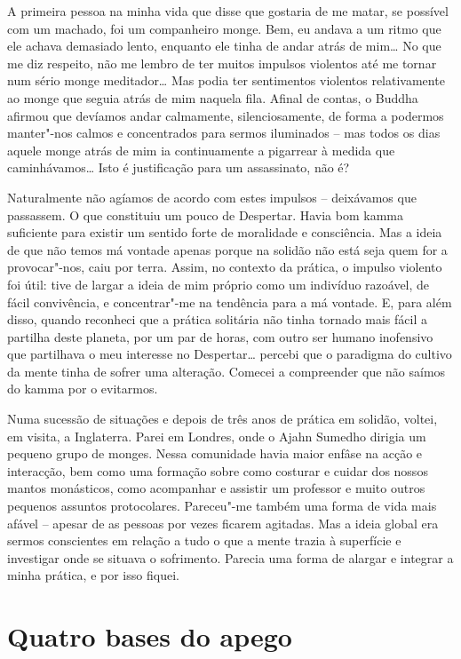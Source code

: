 A primeira pessoa na minha vida que disse que gostaria de me matar, se possível com um machado, foi um companheiro monge. Bem, eu andava a um ritmo que ele achava demasiado lento, enquanto ele tinha de andar atrás de mim\ldots{} No que me diz respeito, não me lembro de ter muitos impulsos violentos até me tornar num sério monge meditador\ldots{} Mas podia ter sentimentos violentos relativamente ao monge que seguia atrás de mim naquela fila. Afinal de contas, o Buddha afirmou que devíamos andar calmamente, silenciosamente, de forma a podermos manter"-nos calmos e concentrados para sermos iluminados -- mas todos os dias aquele monge atrás de mim ia continuamente a pigarrear à medida que caminhávamos\ldots{} Isto é justificação para um assassinato, não é?

Naturalmente não agíamos de acordo com estes impulsos -- deixávamos que passassem. O que constituiu um pouco de Despertar. Havia bom kamma suficiente para existir um sentido forte de moralidade e consciência. Mas a ideia de que não temos má vontade apenas porque na solidão não está seja quem for a provocar"-nos, caiu por terra. Assim, no contexto da prática, o impulso violento foi útil: tive de largar a ideia de mim próprio como um indivíduo razoável, de fácil convivência, e concentrar"-me na tendência para a má vontade. E, para além disso, quando reconheci que a prática solitária não tinha tornado mais fácil a partilha deste planeta, por um par de horas, com outro ser humano inofensivo que partilhava o meu interesse no Despertar\ldots{} percebi que o paradigma do cultivo da mente tinha de sofrer uma alteração. Comecei a compreender que não saímos do kamma por o evitarmos.

Numa sucessão de situações e depois de três anos de prática em solidão, voltei, em visita, a Inglaterra. Parei em Londres, onde o Ajahn Sumedho dirigia um pequeno grupo de monges. Nessa comunidade havia maior enfâse na acção e interacção, bem como uma formação sobre como costurar e cuidar dos nossos mantos monásticos, como acompanhar e assistir um professor e muito outros pequenos assuntos protocolares. Pareceu"-me também uma forma de vida mais afável -- apesar de as pessoas por vezes ficarem agitadas. Mas a ideia global era sermos conscientes em relação a tudo o que a mente trazia à superfície e investigar onde se situava o sofrimento. Parecia uma forma de alargar e integrar a minha prática, e por isso fiquei.

\section{Quatro bases do apego}

